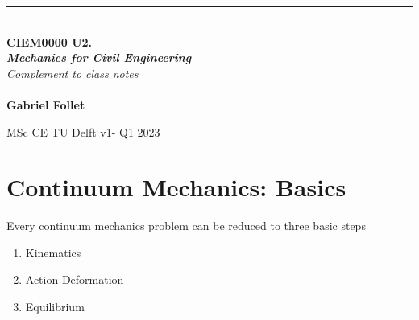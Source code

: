 \documentclass[a4paper, 11pt,article,oneside]{memoir}%
\begin{document}
\noindent
\setlength{\parindent}{0pt}

\begin{titlingpage}
	\raggedleft %
	{\color{magenta}\rule{3 pt}{\textheight}} %
	\hspace{0.05\textwidth} %
	\parbox[b]{0.9\textwidth}{ %
	
		{\\\Huge\bfseries{ CIEM0000 U2.\\
		\textit{Mechanics for Civil Engineering}}}\\[3\baselineskip]  %
		{\large\textit{Complement to class notes }}\\[4\baselineskip] %
      	\\[4\baselineskip] 
		{\color{magenta}\textbf{Gabriel Follet}}
		
		\vspace{0.25\textheight} %
			{\noindent MSc CE TU Delft  v1- Q1 2023}} %

\end{titlingpage}

\tableofcontents
\newpage



\chapter{Continuum Mechanics: Basics}
Every continuum mechanics problem can be reduced to three basic steps

\begin{enumerate}
\item Kinematics
\item Action-Deformation
\item Equilibrium
\end{enumerate}
	
\end{document}
